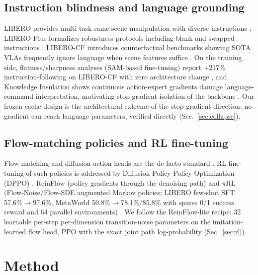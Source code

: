 \documentclass[10pt,twocolumn]{article}
\begin{document}
\subsection{Instruction blindness and language grounding}
LIBERO provides multi-task same-scene manipulation with diverse instructions
\cite{liu2023liberobenchmarkingknowledgetransfer}; LIBERO-Plus formalizes robustness protocols including blank
and swapped instructions \cite{fei2025liberoplusindepthrobustnessanalysis};
LIBERO-CF introduces counterfactual benchmarks showing SOTA VLAs frequently
ignore language when scene features suffice
\cite{libero_cf}. On the training side, flatness/sharpness analyses
(SAM-based fine-tuning) report +217\% instruction-following on LIBERO-CF with
zero architecture change \cite{zhang2026flatnesspreservesinstructionfollowing}, and Knowledge Insulation
shows continuous action-expert gradients damage language-command
interpretation, motivating stop-gradient isolation of the backbone
\cite{driess2025knowledgeinsulatingvisionlanguageactionmodels}. Our frozen-cache design is the architectural
extreme of the stop-gradient direction: no gradient can reach language
parameters, verified directly (Sec.~\ref{sec:collapse}).

\subsection{Flow-matching policies and RL fine-tuning}
Flow matching and diffusion action heads are the de-facto standard
\cite{black2026pi0visionlanguageactionflowmodel,intelligence2025pi05visionlanguageactionmodelopenworld,nvidia2025gr00tn1openfoundation}. RL fine-tuning of such policies is addressed by
Diffusion Policy Policy Optimization (DPPO) \cite{ren2024diffusionpolicypolicyoptimization}, ReinFlow (policy
gradients through the denoising path) \cite{zhang2026reinflowfinetuningflowmatching} and $\pi$RL
(Flow-Noise/Flow-SDE augmented Markov policies; LIBERO few-shot SFT
57.6\%$\rightarrow$97.6\%, MetaWorld 50.8\%$\rightarrow$78.1\%/85.8\% with
sparse 0/1 success reward and 64 parallel environments)
\cite{pi_rl}. We follow the
ReinFlow-lite recipe: 32 learnable per-step per-dimension transition-noise
parameters on the imitation-learned flow head, PPO with the exact joint path
log-probability (Sec.~\ref{sec:rl}).

\section{Method}
\label{sec:method}
\end{document}
